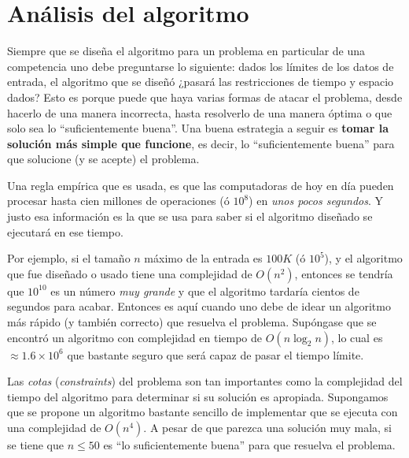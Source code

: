 \section{Análisis del algoritmo}
Siempre que se diseña el algoritmo para un problema en particular de una competencia uno debe
preguntarse lo siguiente: dados los límites de los datos de entrada, el algoritmo que se diseñó
¿pasará las restricciones de tiempo y espacio dados?
Esto es porque puede que haya varias formas de atacar el problema, desde hacerlo de una manera
incorrecta, hasta resolverlo de una manera óptima o que solo sea lo ``suficientemente buena''.
Una buena estrategia a seguir es \textbf{tomar la solución más simple que funcione}, es decir,
lo ``suficientemente buena'' para que solucione (y se acepte) el problema.

Una regla empírica que es usada, es que las computadoras de hoy en día pueden procesar hasta cien
millones de operaciones (ó $10^8$) en \textit{unos pocos segundos}. Y justo esa información es la
que se usa para saber si el algoritmo diseñado se ejecutará en ese tiempo.

Por ejemplo, si el tamaño $n$ máximo de la entrada es $100K$ (ó $10^5$), y el algoritmo que fue
diseñado o usado tiene una complejidad de $O(n^2)$, entonces se tendría que $10^{10}$ es un número
\emph{muy grande} y que el algoritmo tardaría cientos de segundos para acabar. Entonces es aquí
cuando uno debe de idear un algoritmo más rápido (y también correcto) que resuelva el problema.
Supóngase que se encontró un algoritmo con complejidad en tiempo de $O(n \log_2 n)$, lo cual
es $\approx 1.6 \times 10^6$ que bastante seguro que será capaz de pasar el tiempo límite.

Las \emph{cotas} (\emph{constraints}) del problema son tan importantes como la complejidad del
tiempo del algoritmo para determinar si su solución es apropiada. Supongamos que se propone un
algoritmo bastante sencillo de implementar que se ejecuta con una complejidad de $O(n^4)$. A pesar
de que parezca una solución muy mala, si se tiene que $n \leq 50$ es ``lo suficientemente buena''
para que resuelva el problema.

